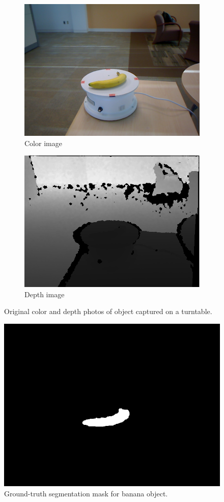 \begin{figure}[htbp]
	\centering
	\begin{subfigure}[b]{0.45\linewidth}
		\includegraphics[width=\textwidth]{img/banana_1_1_1.png}
		\caption{Color image}
	\end{subfigure}   	
	\begin{subfigure}[b]{0.45\linewidth}
		\includegraphics[width=\textwidth]{img/banana_1_1_1_depth.png}
		\caption{Depth image}
	\end{subfigure}
	\caption{Original color and depth photos of object captured on a turntable.}
	\label{fig:orig_img}
\end{figure}

\begin{figure}[htbp]
	\centering
	\includegraphics[width=0.5\linewidth]{img/banana_1_1_1_mask.png}
	\caption{Ground-truth segmentation mask for banana object.}
	\label{fig:img_mask}
\end{figure}

